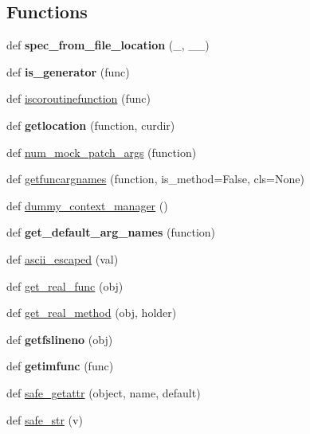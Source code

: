 \subsection*{Functions}
\begin{DoxyCompactItemize}
\item 
\mbox{\label{namespace__pytest_1_1compat_a7af94b721264d3447618916058649812}} 
def {\bfseries spec\+\_\+from\+\_\+file\+\_\+location} (\+\_\+, \+\_\+\+\_\+)
\item 
\mbox{\label{namespace__pytest_1_1compat_a11a1811ad55c7e60df0d196d05dca3cd}} 
def {\bfseries is\+\_\+generator} (func)
\item 
def \hyperlink{namespace__pytest_1_1compat_ad5b3e6b075044794e72742004fd980f6}{iscoroutinefunction} (func)
\item 
\mbox{\label{namespace__pytest_1_1compat_abad49b167f5c0c6a3748f8e792af9f25}} 
def {\bfseries getlocation} (function, curdir)
\item 
def \hyperlink{namespace__pytest_1_1compat_af488d4507f9eca6c852d942058186efe}{num\+\_\+mock\+\_\+patch\+\_\+args} (function)
\item 
def \hyperlink{namespace__pytest_1_1compat_adba26e79f738dbde4738a8bf825ddc4e}{getfuncargnames} (function, is\+\_\+method=False, cls=None)
\item 
def \hyperlink{namespace__pytest_1_1compat_a3da3606628ba324edad1892c335aaa22}{dummy\+\_\+context\+\_\+manager} ()
\item 
\mbox{\label{namespace__pytest_1_1compat_a834e7b5fb64394e90061c33595535fcf}} 
def {\bfseries get\+\_\+default\+\_\+arg\+\_\+names} (function)
\item 
def \hyperlink{namespace__pytest_1_1compat_ae219e73cc18f92f906c0338ee2e095c1}{ascii\+\_\+escaped} (val)
\item 
def \hyperlink{namespace__pytest_1_1compat_a72cd14070d89cdcd90692007d8b6d1b0}{get\+\_\+real\+\_\+func} (obj)
\item 
def \hyperlink{namespace__pytest_1_1compat_a7cb5efdc829d81e210a6bad6a7ba0a9d}{get\+\_\+real\+\_\+method} (obj, holder)
\item 
\mbox{\label{namespace__pytest_1_1compat_a5a6228d7c718a2dff96d71d077400529}} 
def {\bfseries getfslineno} (obj)
\item 
\mbox{\label{namespace__pytest_1_1compat_a2583499614f5ac19cad0fb94adc1a1fd}} 
def {\bfseries getimfunc} (func)
\item 
def \hyperlink{namespace__pytest_1_1compat_a7e7abdf5a8608ba2707053825e7818e8}{safe\+\_\+getattr} (object, name, default)
\item 
def \hyperlink{namespace__pytest_1_1compat_ada77abd26b1ef5408c324cba3d9614d3}{safe\+\_\+str} (v)
\end{DoxyCompactItemize}
